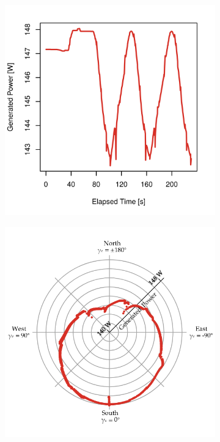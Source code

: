 \documentclass[twocolumn,letterpaper]{IEEEAerospaceCLS}  %
\newlength{\subfigureWidth}
\newlength{\graphicsHeight}
\begin{document}
\begin{figure}[h]
  \captionsetup[subfigure]{justification=centering}
  \centering
  \setlength{\subfigureWidth}{0.24\textwidth}
  \setlength{\graphicsHeight}{40mm}
  \begin{subfigure}[t]{\subfigureWidth}
    \centering
    \includegraphics[height=\graphicsHeight]{figures/plots/zaxis-revolutions.png}
    \label{fig:sub:simulation-data-rover-revolution-generated-power-line-chart}
  \end{subfigure}\hfill
  \begin{subfigure}[t]{\subfigureWidth}
    \centering
    \includegraphics[height=\graphicsHeight]{figures/plots/zaxis-revolutions-polar.png}

\end{subfigure}
\end{figure}
\end{document}
